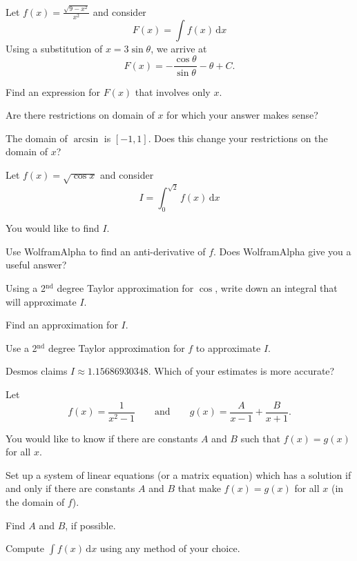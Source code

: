 \documentclass{workbook}
\begin{document}
\begin{slide}
	\question
	Let $\displaystyle f(x)=\frac{\sqrt{9-x^2}}{x^2}$ and consider
	\[
		F(x)=\int f(x)\,\mathrm d x
	\]
	Using a substitution of $x=3\sin\theta$,  we arrive at
	\[
		F(x)=-\frac{\cos\theta}{\sin\theta} - \theta + C.
	\]

	\begin{parts}
		\item Find an expression for $F(x)$ that involves only $x$.
		\item Are there restrictions on domain of $x$ for which your
		answer makes sense?
		\item The domain of $\arcsin$ is $[-1,1]$. Does this change your
		restrictions on the domain of $x$?
	\end{parts}
\end{slide}


\begin{slide}
	\question
	Let $\displaystyle f(x)=\sqrt{\cos x}$ and consider
	\[
		I=\int_0^{\sqrt{2}} f(x)\,\mathrm d x
	\]

	You would like to find $I$.
	\begin{parts}
		\item Use WolframAlpha to find an anti-derivative of $f$.
		Does WolframAlpha give you a useful answer?
		\item Using a 2$^{\text{nd}}$ degree Taylor approximation for $\cos$,
		write down an integral that will approximate $I$.
		\item Find an approximation for $I$.
		\item Use a 2$^{\text{nd}}$ degree Taylor approximation for $f$ to
		approximate $I$.
		\item Desmos claims $I\approx 1.15686930348$. Which of your estimates is more accurate?

	\end{parts}
\end{slide}


\begin{slide}
	\question
	Let
		\[
			f(x)=\frac{1}{x^2-1}\qquad
			\text{and}
			\qquad g(x)=\frac{A}{x-1}+\frac{B}{x+1}.
		\]

	\begin{parts}
		\item
		You would like to know if
		there are constants $A$ and $B$ such that $f(x)=g(x)$ for all $x$.

		Set up a system of linear equations (or a matrix equation) which has a
		solution if and only if there are constants $A$ and $B$ that make $f(x)=g(x)$ for all $x$ (in the domain of $f$).
		\item Find $A$ and $B$, if possible.
		\item Compute $\displaystyle \int f(x)\,\mathrm d x$ using any method of your choice.
	\end{parts}
\end{slide}
\end{document}
